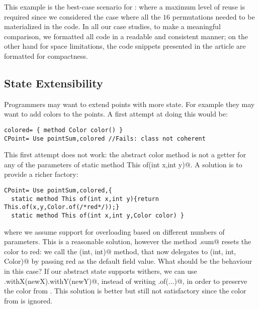 This example is the best-case scenario for \name: where a maximum level of reuse
 is required since we considered the case where all the $16$ permutations needed to be materialized in the code.
In all our case studies, to make a meaningful comparison, we formatted all code in a readable and consistent manner;
on the other hand for space limitations, the code snippets presented in the article
are formatted for compactness.


\subsection{State Extensibility}

Programmers may want to extend points with more state. For example 
they may want to add colors to the points. A first attempt at doing
this would be:
\begin{lstlisting}
colored= { method Color color() }
CPoint= Use pointSum,colored //Fails: class not coherent
\end{lstlisting}
This first attempt does not work: the abstract color method
is not a getter for any of the parameters of 
\Q@ static method This of(int x,int y)@. 
A solution is to provide a richer factory:
\begin{lstlisting}
CPoint= Use pointSum,colored,{
  static method This of(int x,int y){return This.of(x,y,Color.of(/*red*/));}
  static method This of(int x,int y,Color color) }
\end{lstlisting}
where we assume support for overloading based on different numbers of parameters.
This is a reasonable solution, however the method \Q@CPoint.sum@ resets
the color to red: we call the \Q@of(int, int)@ method, that now
delegates to \Q@of(int, int, Color)@ by passing red as the default field
value.  What should be the behaviour in this case?  If our abstract
state supports withers, we can use
\Q@this.withX(newX).withY(newY)@, instead of writing \Q@This.of(...)@, in order to preserve the color from
\Q@this@.  This solution is better but still not satisfactory since the color from \Q@that@ is ignored.

